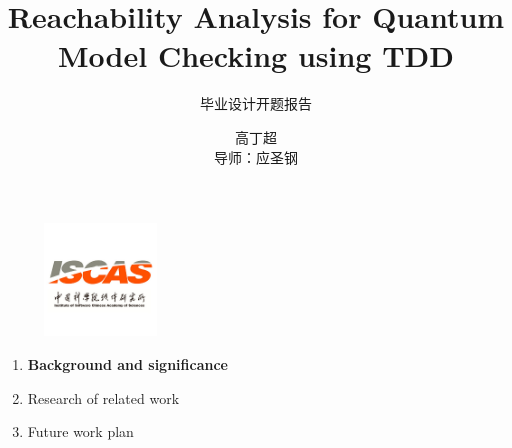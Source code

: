 \documentclass[aspectratio=1610,18pt]{ctexbeamer}
\title[TDD in quantum]{Reachability Analysis for Quantum Model Checking using TDD}
\subtitle{毕业设计开题报告}
\author{高丁超\\导师：应圣钢}
\begin{document}
\begin{frame}[plain]
  \titlepage
  \begin{figure}
    \centering
    \begin{minipage}[t]{0.48\textwidth}
    \centering
    \includegraphics[width=3cm]{iscas.png}
    \end{minipage}
  \end{figure}
\end{frame}
\begin{frame}
  \begin{enumerate}
    \Large
    \item \textbf{Background and significance}
    \item Research of related work
    \item Future work plan
  \end{enumerate}
\end{frame}
\end{document}
